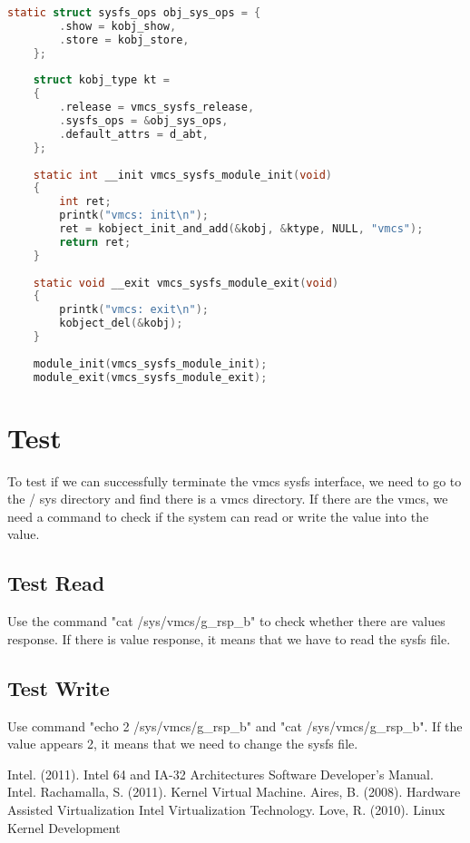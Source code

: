 \documentclass[10pt,draftclsnofoot,peerreview ,letterpaper,onecolumn,]{IEEEtran}
\begin{document}
\begin{lstlisting}[language=C]
	static struct sysfs_ops obj_sys_ops = {
		.show = kobj_show,
		.store = kobj_store,
	};
	
	struct kobj_type kt = 
	{
		.release = vmcs_sysfs_release,
		.sysfs_ops = &obj_sys_ops,
		.default_attrs = d_abt,
	};
	
	static int __init vmcs_sysfs_module_init(void) 
	{
		int ret;
		printk("vmcs: init\n");
		ret = kobject_init_and_add(&kobj, &ktype, NULL, "vmcs");
		return ret;
	}
	
	static void __exit vmcs_sysfs_module_exit(void) 
	{
		printk("vmcs: exit\n");
		kobject_del(&kobj);
	} 
	
	module_init(vmcs_sysfs_module_init);
	module_exit(vmcs_sysfs_module_exit);
	\end{lstlisting}
	
	\newpage
	\section{Test}
	To test if we can successfully terminate the vmcs sysfs interface, we need to go to the / sys directory and find there is a vmcs directory. If there are the vmcs, we need a command to check if the system can read or write the value into the value.
	\subsection{Test Read}
	Use the command "cat /sys/vmcs/g\_rsp\_b" to check whether there are values response. If there is value response, it means that we have to read the sysfs file.
	\subsection{Test Write}
	Use command "echo 2 /sys/vmcs/g\_rsp\_b" and "cat /sys/vmcs/g\_rsp\_b". If the value appears 2, it means that we need to change the sysfs file.
	
	
	\newpage
	\begin{thebibliography}{1}
			Intel. (2011). Intel 64 and IA-32 Architectures Software Developer's Manual. Intel.
		Rachamalla, S. (2011). Kernel Virtual Machine.
		Aires, B. (2008). Hardware Assisted Virtualization Intel Virtualization Technology.
		 Love, R. (2010). Linux Kernel Development
	\end{thebibliography}
	
\end{document}
